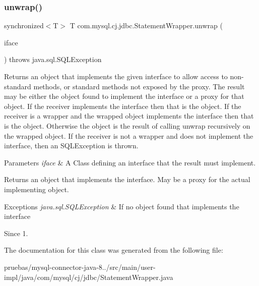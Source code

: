 \subsubsection{\texorpdfstring{unwrap()}{unwrap()}}
{\footnotesize\ttfamily synchronized$<$T$>$ T com.\+mysql.\+cj.\+jdbc.\+Statement\+Wrapper.\+unwrap (\begin{DoxyParamCaption}\item[{java.\+lang.\+Class$<$ T $>$}]{iface }\end{DoxyParamCaption}) throws java.\+sql.\+S\+Q\+L\+Exception}

Returns an object that implements the given interface to allow access to non-\/standard methods, or standard methods not exposed by the proxy. The result may be either the object found to implement the interface or a proxy for that object. If the receiver implements the interface then that is the object. If the receiver is a wrapper and the wrapped object implements the interface then that is the object. Otherwise the object is the result of calling {\ttfamily unwrap} recursively on the wrapped object. If the receiver is not a wrapper and does not implement the interface, then an {\ttfamily S\+Q\+L\+Exception} is thrown.


\begin{DoxyParams}{Parameters}
{\em iface} & A Class defining an interface that the result must implement. \\
\hline
\end{DoxyParams}
\begin{DoxyReturn}{Returns}
an object that implements the interface. May be a proxy for the actual implementing object. 
\end{DoxyReturn}

\begin{DoxyExceptions}{Exceptions}
{\em java.\+sql.\+S\+Q\+L\+Exception} & If no object found that implements the interface \\
\hline
\end{DoxyExceptions}
\begin{DoxySince}{Since}
1. 
\end{DoxySince}


The documentation for this class was generated from the following file\+:\begin{DoxyCompactItemize}
\item 
pruebas/mysql-\/connector-\/java-\/8../src/main/user-\/impl/java/com/mysql/cj/jdbc/Statement\+Wrapper.\+java\end{DoxyCompactItemize}
